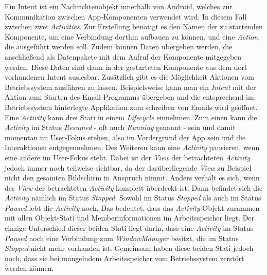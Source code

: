 Ein Intent ist ein Nachrichtenobjekt innerhalb von Android, welches zur Kommunikation zwischen App-Komponenten verwendet wird. In diesem Fall zwischen zwei \textit{Activities}. Zur Erstellung benötigt es den Namen der zu startenden Komponente, um eine Verbindung dorthin aufbauen zu können, und eine \textit{Action}, die ausgeführt werden soll. Zudem können Daten übergeben werden, die anschließend als Datenpakete mit dem Aufruf der Komponente mitgegeben werden. Diese Daten sind dann in der gestarteten Komponente aus dem dort vorhandenen Intent auslesbar. Zusätzlich gibt es die Möglichkeit Aktionen vom Betriebssystem ausführen zu lassen. Beispielsweise kann man ein \textit{Intent} mit der Aktion zum Starten des Email-Programms übergeben und die entsprechend im Betriebssystem hinterlegte Applikation zum schreiben von Emails wird geöffnet.\\
Eine \textit{Activity} kann drei Stati in einem \textit{Lifecycle} einnehmen. Zum einen kann die \textit{Activity} im Status \textit{Resumed} - oft auch \textit{Running} genannt - sein und damit momentan im User-Fokus stehen, also im Vordergrund der App sein und die Interaktionen entgegennehmen. Des Weiteren kann eine \textit{Activity} pausieren, wenn eine andere im User-Fokus steht. Dabei ist der \textit{View} der betrachteten \textit{Activity} jedoch immer noch teilweise sichtbar, da der darüberliegende \textit{View} zu Beispiel nicht den gesamten Bildschirm in Anspruch nimmt. Anders verhält es sich, wenn der \textit{View} der betrachteten \textit{Activity} komplett überdeckt ist. Dann befindet sich die \textit{Activity} nämlich im Status \textit{Stopped}. Sowohl im Status \textit{Stopped} als auch im Status \textit{Paused} lebt die \textit{Activity} noch. Das bedeutet, dass das \textit{Activity}-Objekt zusammen mit allen Objekt-Stati und Memberinformationen im Arbeitsspeicher liegt. Der einzige Unterschied dieser beiden Stati liegt darin, dass eine \textit{Activity} im Status \textit{Paused} noch eine Verbindung zum \textit{WindowManager} besitzt, die im Status \textit{Stopped} nicht mehr vorhanden ist. Gemeinsam haben diese beiden Stati jedoch noch, dass sie bei mangelndem Arbeitsspeicher vom Betriebssystem zerstört werden können. 

